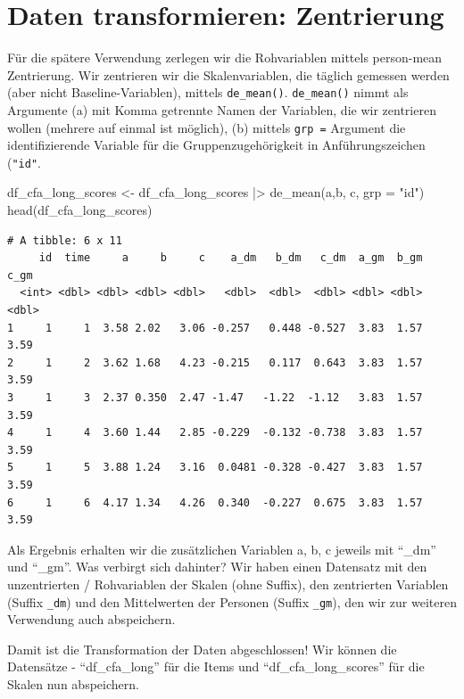 \documentclass[
  letterpaper,
  DIV=11,
  numbers=noendperiod]{scrreprt}
\newenvironment{Shaded}{\begin{snugshade}}{\end{snugshade}}
\newcommand{\AttributeTok}[1]{\textcolor[rgb]{0.40,0.45,0.13}{#1}}
\newcommand{\FunctionTok}[1]{\textcolor[rgb]{0.28,0.35,0.67}{#1}}
\newcommand{\NormalTok}[1]{\textcolor[rgb]{0.00,0.23,0.31}{#1}}
\newcommand{\OtherTok}[1]{\textcolor[rgb]{0.00,0.23,0.31}{#1}}
\newcommand{\SpecialCharTok}[1]{\textcolor[rgb]{0.37,0.37,0.37}{#1}}
\newcommand{\StringTok}[1]{\textcolor[rgb]{0.13,0.47,0.30}{#1}}
\begin{document}
\section{Daten transformieren:
Zentrierung}\label{daten-transformieren-zentrierung}

Für die spätere Verwendung zerlegen wir die Rohvariablen mittels
person-mean Zentrierung. Wir zentrieren wir die Skalenvariablen, die
täglich gemessen werden (aber nicht Baseline-Variablen), mittels
\texttt{de\_mean()}. \texttt{de\_mean()} nimmt als Argumente (a) mit
Komma getrennte Namen der Variablen, die wir zentrieren wollen (mehrere
auf einmal ist möglich), (b) mittels \texttt{grp\ =} Argument die
identifizierende Variable für die Gruppenzugehörigkeit in
Anführungszeichen (\texttt{"id"}.

\begin{Shaded}
\begin{Highlighting}[]
\NormalTok{df\_cfa\_long\_scores }\OtherTok{\textless{}{-}}\NormalTok{ df\_cfa\_long\_scores }\SpecialCharTok{|\textgreater{}} 
  \FunctionTok{de\_mean}\NormalTok{(a,b, c, }\AttributeTok{grp =} \StringTok{"id"}\NormalTok{)}
\FunctionTok{head}\NormalTok{(df\_cfa\_long\_scores)}
\end{Highlighting}
\end{Shaded}

\begin{verbatim}
# A tibble: 6 x 11
     id  time     a     b     c    a_dm   b_dm   c_dm  a_gm  b_gm  c_gm
  <int> <dbl> <dbl> <dbl> <dbl>   <dbl>  <dbl>  <dbl> <dbl> <dbl> <dbl>
1     1     1  3.58 2.02   3.06 -0.257   0.448 -0.527  3.83  1.57  3.59
2     1     2  3.62 1.68   4.23 -0.215   0.117  0.643  3.83  1.57  3.59
3     1     3  2.37 0.350  2.47 -1.47   -1.22  -1.12   3.83  1.57  3.59
4     1     4  3.60 1.44   2.85 -0.229  -0.132 -0.738  3.83  1.57  3.59
5     1     5  3.88 1.24   3.16  0.0481 -0.328 -0.427  3.83  1.57  3.59
6     1     6  4.17 1.34   4.26  0.340  -0.227  0.675  3.83  1.57  3.59
\end{verbatim}

Als Ergebnis erhalten wir die zusätzlichen Variablen a, b, c jeweils mit
``\_dm'' und ``\_gm''. Was verbirgt sich dahinter? Wir haben einen
Datensatz mit den unzentrierten / Rohvariablen der Skalen (ohne Suffix),
den zentrierten Variablen (Suffix \texttt{\_dm}) und den Mittelwerten
der Personen (Suffix \texttt{\_gm}), den wir zur weiteren Verwendung
auch abspeichern.

Damit ist die Transformation der Daten abgeschlossen! Wir können die
Datensätze - ``df\_cfa\_long'' für die Items und
``df\_cfa\_long\_scores'' für die Skalen nun abspeichern.
\end{document}
